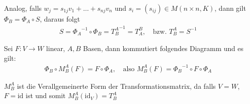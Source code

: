 Analog, falls $w_j = s_{1j} v_{1} + \ldots + s_{nj} v_{n}$ und $s_i = (s_{ij}) \in M(n\times n,K)$, dann gilt $\Phi_B = \Phi_A \circ S$, daraus folgt
\begin{align*}
    S = {\Phi_A}^{-1} \circ \Phi_B = {T_{B}^{A}}^{-1} = T_{A}^{B}, \quad \text{bzw. } T_{B}^{A} = {S}^{-1}
\end{align*}
\vspace{40pt}
\begin{mdframed}
Sei $F: V \rightarrow W$ linear, $A, B$ Basen, dann kommutiert folgendes Diagramm und es gilt:
\begin{align*}
    \Phi_B \circ M_{B}^{A}(F) = F \circ \Phi_A, \quad \text{also } M_{B}^{A}(F) = {\Phi_B}^{-1} \circ F \circ \Phi_A
\end{align*}
\begin{center}
\end{center}
$M_{B}^{A}$ ist die Verallgemeinerte Form der Transformationsmatrix, da falls $V = W$, $F = \text{id}$ ist und somit $M_{B}^{A}(\text{id}_V) = T_{B}^{A}$
\end{mdframed}

